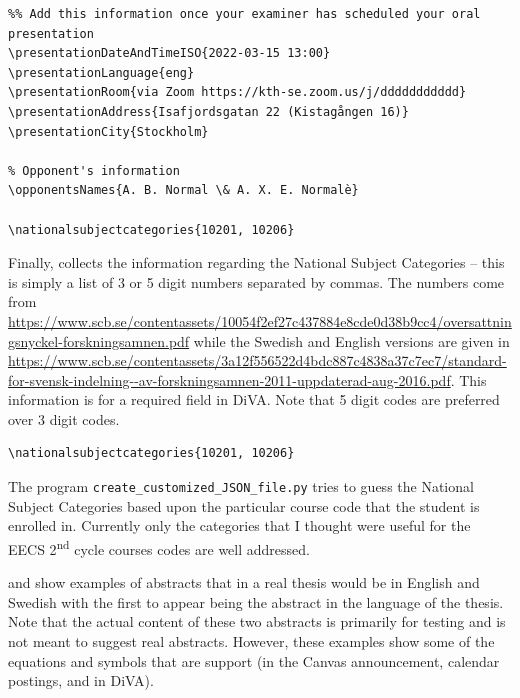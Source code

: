 \else
\begin{lstlisting}[language={[LaTeX]TeX}, extendedchars=false, caption={Information relevant to the oral presentation (both the location and the opponent or opponents)}, label=lst:oralpresentatioOpponents] 
%%%%% For the oral presentation
%% Add this information once your examiner has scheduled your oral presentation
\presentationDateAndTimeISO{2022-03-15 13:00}
\presentationLanguage{eng}
\presentationRoom{via Zoom https://kth-se.zoom.us/j/ddddddddddd}
\presentationAddress{Isafjordsgatan 22 (Kistagången 16)}
\presentationCity{Stockholm}

% Opponent's information
\opponentsNames{A. B. Normal \& A. X. E. Normalè}

\nationalsubjectcategories{10201, 10206}
\end{lstlisting}
\fi
{}
Finally,  collects the information regarding the National Subject Categories – this is simply a list of 3 or 5 digit numbers separated by commas. The numbers come from \url{https://www.scb.se/contentassets/10054f2ef27c437884e8cde0d38b9cc4/oversattningsnyckel-forskningsamnen.pdf} while the Swedish and English versions are given in \url{https://www.scb.se/contentassets/3a12f556522d4bdc887c4838a37c7ec7/standard-for-svensk-indelning--av-forskningsamnen-2011-uppdaterad-aug-2016.pdf}. This information is for a required field in DiVA. Note that 5 digit codes are preferred over 3 digit codes.
\begin{lstlisting}[language={[LaTeX]TeX}, caption={Information relevant to the oral presentation (both the location and the opponent or opponents}, label=lst:nationalSubjects] 
\nationalsubjectcategories{10201, 10206}
\end{lstlisting}

The program \texttt{create\_customized\_JSON\_file.py} tries to guess the National Subject Categories based upon the particular course code that the student is enrolled in. Currently only the categories that I thought were useful for the EECS 2\textsuperscript{nd} cycle courses codes are well addressed.

 and  show examples of abstracts that in a real thesis would be in English and Swedish with the first to appear being the abstract in the language of the thesis. Note that the actual content of these two abstracts is primarily for testing and is not meant to suggest real abstracts. However, these examples show some of the equations and symbols that are support (\ie in the Canvas announcement, calendar postings, and in DiVA).

